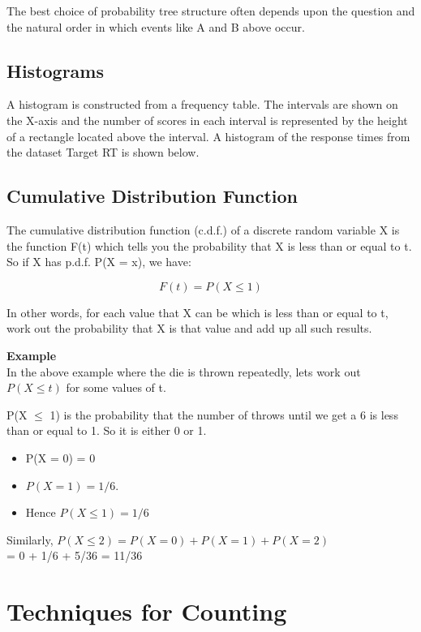\documentclass[12pt]{article}
\begin{document}
The best choice of probability tree structure often depends upon the question and the natural order in which events like A and B above occur.


\subsection{Histograms}
A histogram is constructed from a frequency table. The intervals are shown on the X-axis and the number of scores in each interval is represented by the height of a rectangle located above the interval. A histogram of the response times from the dataset Target RT is shown below.



\subsection{Cumulative Distribution Function}

The cumulative distribution function (c.d.f.) of a discrete random variable X is the function F(t) which tells you the probability that X is less than or equal to t. So if X has p.d.f. P(X = x), we have:

\[F(t) = P(X \leq 1)\] %

In other words, for each value that X can be which is less than or equal to t, work out the probability that X is that value and add up all such results.

\textbf{Example}\\

In the above example where the die is thrown repeatedly, lets work out $P(X \leq t)$ for some values of t.

P(X $\leq$ 1) is the probability that the number of throws until we get a 6 is less than or equal to 1. So it is either 0 or 1. 

\begin{itemize}
\item P(X = 0) = 0 
\item $P(X = 1) = 1/6$.
\item  Hence $P(X \leq 1) = 1/6$
\end{itemize}

Similarly, $P(X \leq 2) = P(X = 0) + P(X = 1) + P(X = 2)$\\ = 0 + 1/6 + 5/36 = 11/36

\newpage
\section{Techniques for Counting}
\end{document}
